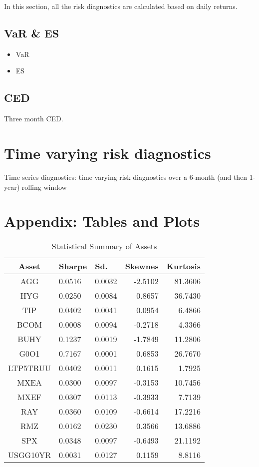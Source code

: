 \documentclass[12pt]{article}
\begin{document}
In this section, all the risk diagnostics are calculated based on daily returns.

\subsection{VaR \& ES}

\begin{itemize}
\item VaR
\item ES
\end{itemize}



\subsection{CED}

Three month CED.



\section{Time varying risk diagnostics}


Time series diagnostics: time varying risk diagnostics over a 6-month (and then 1-year) rolling window


\section{Appendix: Tables and Plots}


\begin{table}[!h]
\caption{Statistical Summary of Assets} %
\centering 
\begin{tabular}{ | c || p{1.5cm} p{1.5cm} r r | } 
 \hline
Asset & Sharpe  & Sd. & Skewnes & Kurtosis \\
  \hline \hline
AGG & 0.0516 & 0.0032 & -2.5102 & 81.3606\\ 
HYG & 0.0250 & 0.0084 &  0.8657 & 36.7430\\ 
TIP & 0.0402 & 0.0041 &  0.0954 &  6.4866\\ 
BCOM & 0.0008 & 0.0094 & -0.2718 &  4.3366\\ 
BUHY & 0.1237 & 0.0019 & -1.7849 & 11.2806\\ 
G0O1 & 0.7167 & 0.0001 &  0.6853 & 26.7670\\ 
LTP5TRUU & 0.0402 & 0.0011 &  0.1615 &  1.7925\\ 
MXEA & 0.0300 & 0.0097 & -0.3153 & 10.7456\\ 
MXEF & 0.0307 & 0.0113 & -0.3933 &  7.7139\\ 
RAY & 0.0360 & 0.0109 & -0.6614 & 17.2216\\ 
RMZ & 0.0162 & 0.0230 &  0.3566 & 13.6886\\ 
SPX & 0.0348 & 0.0097 & -0.6493 & 21.1192\\ 
USGG10YR & 0.0031 & 0.0127 &  0.1159 &  8.8116 \\
 \hline
\end{tabular}
\label{table:statSum}
\end{table}
\end{document}
